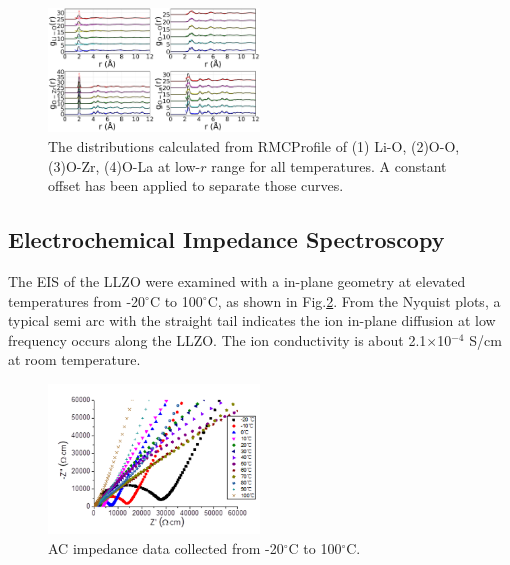 \documentclass[twoside,twocolumn,9pt]{article}
\begin{document}
\begin{figure}[t]
\centering
\includegraphics[width=0.5\textwidth]{Pics/partialPDFs.pdf}
\caption{The distributions calculated from RMCProfile of (1) Li-O, (2)O-O, (3)O-Zr, (4)O-La at low-$r$ range for all temperatures. A constant offset has been applied to separate those curves.}
\label{fig:partialPDFs}
\end{figure}
%


\subsection{Electrochemical Impedance Spectroscopy}

The EIS of the LLZO were examined with a in-plane geometry at elevated temperatures from -20$^\circ$C to 100$^\circ$C, as shown in  Fig.\ref{fig:impedance}.
From the Nyquist plots, a typical semi arc with the straight tail indicates the ion in-plane diffusion at low frequency occurs along the LLZO.
The ion conductivity is about 2.1$\times$10$^{-4}$ S/cm at room temperature.

\begin{figure}[t]
\centering
\includegraphics[width=0.5\textwidth]{Pics/impedance.png}
\caption{AC impedance data collected from -20$^\circ$C to 100$^\circ$C.}
\label{fig:impedance}
\end{figure}
\end{document}

